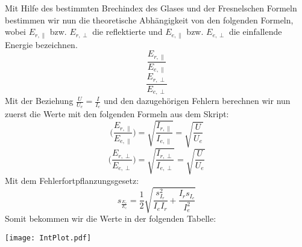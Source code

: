 Mit Hilfe des bestimmten Brechindex des Glases und der Fresnelschen Formeln bestimmen wir nun die theoretische Abhängigkeit von den folgenden Formeln, wobei $E_{r,\parallel}$ bzw. $E_{r,\perp}$ die reflektierte und $E_{e,\parallel}$ bzw. $E_{e,\perp}$ die einfallende Energie bezeichnen. 
\begin{equation}
\frac{E_{r,\parallel}}{E_{e,\parallel}}  
\end{equation}
\begin{equation}
\frac{E_{r,\perp}}{E_{e,\perp}}
\end{equation}
Mit der Beziehung $\frac{U}{U_e}=\frac{I}{I_e}$ und den dazugehörigen Fehlern berechnen wir nun zuerst die Werte mit den folgenden Formeln aus dem Skript:
\begin{equation}
\biggl( \frac{E_{r,\parallel}}{E_{e,\parallel}} \biggr)=\sqrt{\frac{I_{r,\parallel}}{I_{e,\parallel}}} = \sqrt{\frac{U}{U_e}}
\end{equation}
\begin{equation}
\biggl( \frac{E_{r,\perp}}{E_{e,\perp}} \biggr)=\sqrt{\frac{I_{r,\perp}}{I_{e,\perp}}}=\sqrt{\frac{U}{U_e}}
\end{equation}
Mit dem Fehlerfortpflanzungsgesetz:
\begin{equation}
s_{\frac{E_r}{E_e}}=\frac{1}{2}\sqrt{\frac{s^2_{I_r}}{I_eI_r}+\frac{I_rs_{I_e}}{I_e^2}}
\end{equation}
Somit bekommen wir die Werte in der folgenden Tabelle:




\texttt{[image: IntPlot.pdf]}





